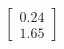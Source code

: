 \documentclass[preview]{standalone}
\begin{document}
\begin{align*}
\begin{bmatrix} 0.24 \\ 1.65 \end{bmatrix}
\end{align*}
\end{document}
